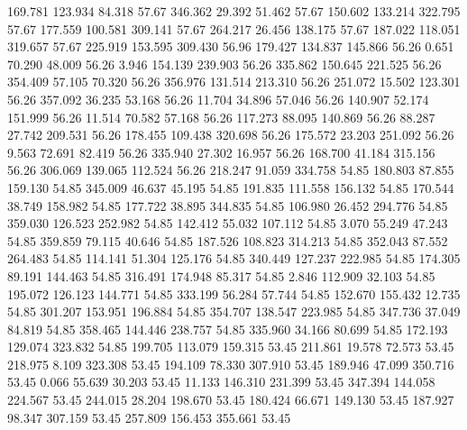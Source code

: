  169.781  123.934   84.318        57.67
 346.362   29.392   51.462        57.67
 150.602  133.214  322.795        57.67
 177.559  100.581  309.141        57.67
 264.217   26.456  138.175        57.67
 187.022  118.051  319.657        57.67
 225.919  153.595  309.430        56.96
 179.427  134.837  145.866        56.26
   0.651   70.290   48.009        56.26
   3.946  154.139  239.903        56.26
 335.862  150.645  221.525        56.26
 354.409   57.105   70.320        56.26
 356.976  131.514  213.310        56.26
 251.072   15.502  123.301        56.26
 357.092   36.235   53.168        56.26
  11.704   34.896   57.046        56.26
 140.907   52.174  151.999        56.26
  11.514   70.582   57.168        56.26
 117.273   88.095  140.869        56.26
  88.287   27.742  209.531        56.26
 178.455  109.438  320.698        56.26
 175.572   23.203  251.092        56.26
   9.563   72.691   82.419        56.26
 335.940   27.302   16.957        56.26
 168.700   41.184  315.156        56.26
 306.069  139.065  112.524        56.26
 218.247   91.059  334.758        54.85
 180.803   87.855  159.130        54.85
 345.009   46.637   45.195        54.85
 191.835  111.558  156.132        54.85
 170.544   38.749  158.982        54.85
 177.722   38.895  344.835        54.85
 106.980   26.452  294.776        54.85
 359.030  126.523  252.982        54.85
 142.412   55.032  107.112        54.85
   3.070   55.249   47.243        54.85
 359.859   79.115   40.646        54.85
 187.526  108.823  314.213        54.85
 352.043   87.552  264.483        54.85
 114.141   51.304  125.176        54.85
 340.449  127.237  222.985        54.85
 174.305   89.191  144.463        54.85
 316.491  174.948   85.317        54.85
   2.846  112.909   32.103        54.85
 195.072  126.123  144.771        54.85
 333.199   56.284   57.744        54.85
 152.670  155.432   12.735        54.85
 301.207  153.951  196.884        54.85
 354.707  138.547  223.985        54.85
 347.736   37.049   84.819        54.85
 358.465  144.446  238.757        54.85
 335.960   34.166   80.699        54.85
 172.193  129.074  323.832        54.85
 199.705  113.079  159.315        53.45
 211.861   19.578   72.573        53.45
 218.975    8.109  323.308        53.45
 194.109   78.330  307.910        53.45
 189.946   47.099  350.716        53.45
   0.066   55.639   30.203        53.45
  11.133  146.310  231.399        53.45
 347.394  144.058  224.567        53.45
 244.015   28.204  198.670        53.45
 180.424   66.671  149.130        53.45
 187.927   98.347  307.159        53.45
 257.809  156.453  355.661        53.45
